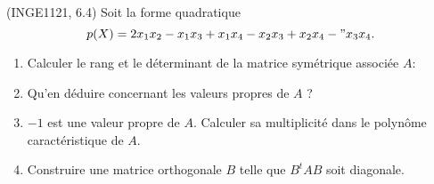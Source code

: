 
\begin{exercice}\label{exoINGE1121La0014}

	(INGE1121, 6.4) Soit la forme quadratique
	\begin{equation}
		p(X)=2x_1x_2-x_1x_3+x_1x_4-x_2x_3+x_2x_4-"x_3x_4.
	\end{equation}
	\begin{enumerate}

		\item
			Calculer le rang et le déterminant de la matrice symétrique associée $A$:
		\item
			Qu'en déduire concernant les valeurs propres de $A$ ?
		\item
			$-1$ est une valeur propre de $A$. Calculer sa multiplicité dans le polynôme caractéristique de $A$.
		\item
			Construire une matrice orthogonale $B$ telle que $B^tAB$ soit diagonale.

	\end{enumerate}
	

\end{exercice}
